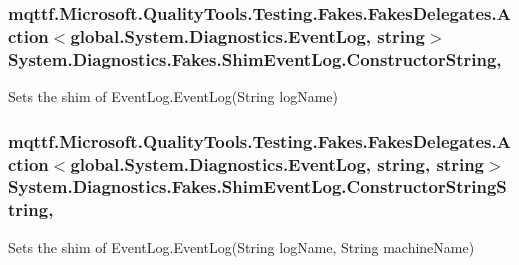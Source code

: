 \hypertarget{class_system_1_1_diagnostics_1_1_fakes_1_1_shim_event_log_a4653ec5aad280e206dbf608e90f6b3c2}{
\subsubsection[{Constructor\-String}]{\setlength{\rightskip}{0pt plus 5cm}mqttf.\-Microsoft.\-Quality\-Tools.\-Testing.\-Fakes.\-Fakes\-Delegates.\-Action$<$global.\-System.\-Diagnostics.\-Event\-Log, string$>$ System.\-Diagnostics.\-Fakes.\-Shim\-Event\-Log.\-Constructor\-String\hspace{0.3cm}{\ttfamily [static]}, {\ttfamily [set]}}}\label{class_system_1_1_diagnostics_1_1_fakes_1_1_shim_event_log_a4653ec5aad280e206dbf608e90f6b3c2}


Sets the shim of Event\-Log.\-Event\-Log(\-String log\-Name)

\hypertarget{class_system_1_1_diagnostics_1_1_fakes_1_1_shim_event_log_a406f44312f4fc4b3656b9e31def03966}{
\subsubsection[{Constructor\-String\-String}]{\setlength{\rightskip}{0pt plus 5cm}mqttf.\-Microsoft.\-Quality\-Tools.\-Testing.\-Fakes.\-Fakes\-Delegates.\-Action$<$global.\-System.\-Diagnostics.\-Event\-Log, string, string$>$ System.\-Diagnostics.\-Fakes.\-Shim\-Event\-Log.\-Constructor\-String\-String\hspace{0.3cm}{\ttfamily [static]}, {\ttfamily [set]}}}\label{class_system_1_1_diagnostics_1_1_fakes_1_1_shim_event_log_a406f44312f4fc4b3656b9e31def03966}


Sets the shim of Event\-Log.\-Event\-Log(\-String log\-Name, String machine\-Name)

